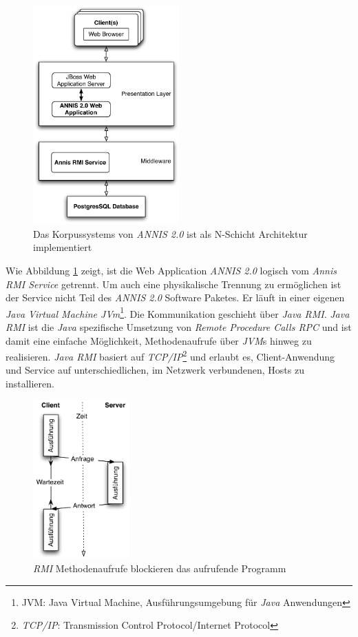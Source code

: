 \begin{figure}[H]
	\centering
	\includegraphics*[width=0.5\textwidth]{figures/DA/KorpussystemArchitektur.pdf}
	\caption{Das Korpussystems von \emph{ANNIS 2.0} ist als N-Schicht Architektur implementiert}\label{fig:KorpussystemArchitektur}
\end{figure}

Wie Abbildung \ref{fig:KorpussystemArchitektur} zeigt, ist die Web Application \emph{ANNIS 2.0} logisch vom \emph{Annis RMI Service} getrennt. Um auch eine physikalische Trennung zu ermöglichen ist der Service nicht Teil des \emph{ANNIS 2.0} Software Paketes. Er läuft in einer eigenen \emph{Java Virtual Machine JVm}\footnote{JVM: Java Virtual Machine, Ausführungsumgebung für \emph{Java} Anwendungen}. Die Kommunikation geschieht über \emph{Java RMI}. \emph{Java RMI} ist die \emph{Java} spezifische Umsetzung von \emph{Remote Procedure Calls RPC} und ist damit eine einfache Möglichkeit, Methodenaufrufe über \emph{JVM}s hinweg zu realisieren. \emph{Java RMI} basiert auf \emph{TCP/IP}\footnote{\emph{TCP/IP}: Transmission Control Protocol/Internet Protocol} und erlaubt es, Client-Anwendung und Service auf unterschiedlichen, im Netzwerk verbundenen, Hosts zu installieren.

\begin{figure}[H]
	\centering
	\includegraphics*[width=0.33\textwidth]{figures/DA/RMI-Blocking.pdf}
	\caption{\emph{RMI} Methodenaufrufe blockieren das aufrufende Programm}\label{fig:RMI.Blocking}
\end{figure}

